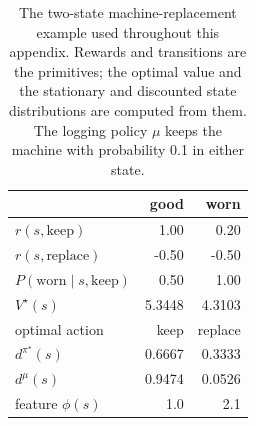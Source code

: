 \begin{table}[h]
\centering
\caption{The two-state machine-replacement example used throughout this appendix. Rewards and transitions are the primitives; the optimal value and the stationary and discounted state distributions are computed from them. The logging policy $\mu$ keeps the machine with probability 0.1 in either state.}
\label{tab:prelim_running_example}
\begin{tabular}{lrr}
\hline
 & good & worn \\
\hline
$r(s, \text{keep})$ & 1.00 & 0.20 \\
$r(s, \text{replace})$ & -0.50 & -0.50 \\
$P(\text{worn} \mid s, \text{keep})$ & 0.50 & 1.00 \\
\hline
$V^\star(s)$ & 5.3448 & 4.3103 \\
optimal action & keep & replace \\
$d^{\pi^\star}(s)$ & 0.6667 & 0.3333 \\
$d^{\mu}(s)$ & 0.9474 & 0.0526 \\
feature $\phi(s)$ & 1.0 & 2.1 \\
\hline
\end{tabular}
\end{table}
